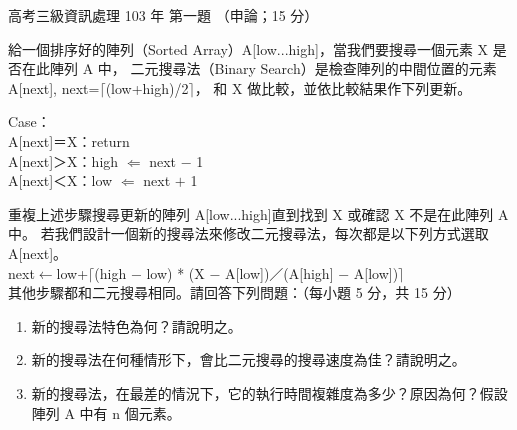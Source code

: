 \begin{pastexam}[label={px:gk3-103-ds-01}]{高考三級資訊處理 103 年 第一題}
（申論；15 分）

給一個排序好的陣列（Sorted Array）A[low...high]，當我們要搜尋一個元素 X 是否在此陣列 A 中，
二元搜尋法（Binary Search）是檢查陣列的中間位置的元素 A[next], next=$\lceil$(low+high)/2$\rceil$，
和 X 做比較，並依比較結果作下列更新。

\hspace*{2em}Case：\\
\hspace*{5em}A[next]＝X：return\\
\hspace*{5em}A[next]＞X：high $\Leftarrow$ next $-$ 1\\
\hspace*{5em}A[next]＜X：low $\Leftarrow$ next $+$ 1

重複上述步驟搜尋更新的陣列 A[low...high]直到找到 X 或確認 X 不是在此陣列 A 中。
若我們設計一個新的搜尋法來修改二元搜尋法，每次都是以下列方式選取 A[next]。\\
next$\leftarrow$low+$\lceil$(high $-$ low) * (X $-$ A[low])／(A[high] $-$ A[low])$\rceil$\\
其他步驟都和二元搜尋相同。請回答下列問題：（每小題 5 分，共 15 分）
\begin{enumerate}[leftmargin=2.2em]
\item[㈠] 新的搜尋法特色為何？請說明之。
\item[㈡] 新的搜尋法在何種情形下，會比二元搜尋的搜尋速度為佳？請說明之。
\item[㈢] 新的搜尋法，在最差的情況下，它的執行時間複雜度為多少？原因為何？假設陣列 A 中有 n 個元素。
\end{enumerate}
\end{pastexam}

